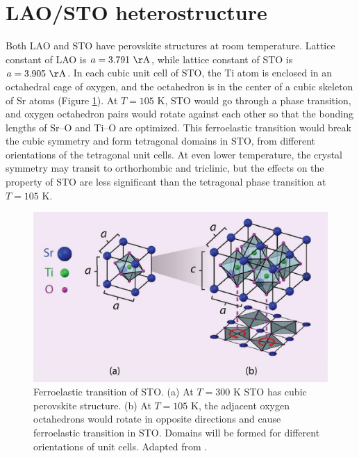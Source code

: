 \documentclass[pdflatex, sectionletters, 12pt, final, phd]{pittetd}    %
\begin{document}
\section{LAO/STO heterostructure}

Both LAO and STO have perovskite structures at room temperature. Lattice constant of LAO is $a = 3.791 \ \mathrm{\AA}$\cite{geller1956crystallographic}, while lattice constant of STO is $a = 3.905 \ \mathrm{\AA}$. In each cubic unit cell of STO, the Ti atom is enclosed in an octahedral cage of oxygen, and the octahedron is in the center of a cubic skeleton of Sr atoms (Figure \ref{FIG:STOPhaseTransition}). At $T=105$ K, STO would go through a phase transition, and oxygen octahedron pairs would rotate against each other so that the bonding lengths of Sr--O and Ti--O are optimized\cite{sulpizio2014nanoscale}. This ferroelastic transition would break the cubic symmetry and form tetragonal domains in STO, from different orientations of the tetragonal unit cells. At even lower temperature, the crystal symmetry may transit to orthorhombic and triclinic, but the effects on the property of STO are less significant than the tetragonal phase transition at $T=105$ K.

\begin{figure}[h!]
	\centering
	\includegraphics[width=.80\textwidth]{Drawing/STOPhaseTransition.pdf}
	\caption[Ferroelastic transition of STO]{Ferroelastic transition of STO. (a) At $T=300$ K STO has cubic perovskite structure. (b) At $T = 105$ K, the adjacent oxygen octahedrons would rotate in opposite directions and cause ferroelastic transition in STO. Domains will be formed for different orientations of unit cells. Adapted from \cite{sulpizio2014nanoscale}.}
	\label{FIG:STOPhaseTransition}
\end{figure}
\end{document}
